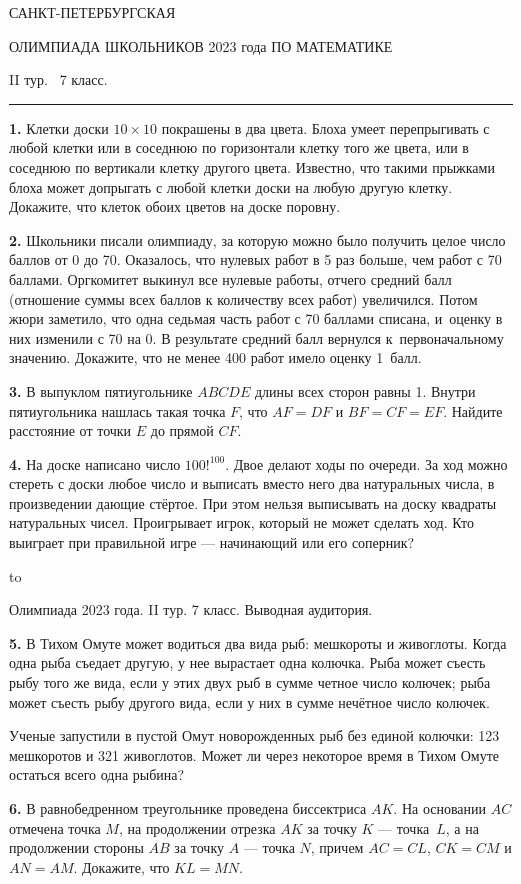 \documentclass[12pt]{article}
\def\q#1.{{\bf #1. }}
\def\dotline{\smallskip\hbox to \hsize{\dotfill}\medskip}
\begin{document}
\clearpage

\centerline{\sc САНКТ-ПЕТЕРБУРГСКАЯ}
\centerline{\sc ОЛИМПИАДА ШКОЛЬНИКОВ 2023 года ПО МАТЕМАТИКЕ}
\centerline{\sc II тур. \ 7 класс.}
\medskip
\hrule
\medskip

\q1. Клетки доски $10\times 10$ покрашены в два цвета. Блоха умеет перепрыгивать с любой клетки или в соседнюю по горизонтали клетку того же цвета, или в соседнюю по вертикали клетку другого цвета. Известно, что такими прыжками блоха может допрыгать с любой клетки доски на любую другую клетку. Докажите, что клеток обоих цветов на доске поровну.

\q2. Школьники писали олимпиаду, за которую можно было получить целое число баллов от 0 до 70. Оказалось, что нулевых работ в 5 раз больше, чем работ с 70 баллами. Оргкомитет выкинул все нулевые работы, отчего средний балл (отношение суммы всех баллов к количеству всех работ) увеличился. Потом жюри заметило, что одна седьмая часть работ с 70 баллами списана, и~оценку в них изменили с 70 на 0. В результате средний балл вернулся к~первоначальному значению. Докажите, что не менее 400 работ имело оценку 1~балл.

\q3. В выпуклом пятиугольнике $ABCDE$ длины всех сторон равны 1. Внутри пятиугольника нашлась такая точка $F$, что $AF=DF$ и $BF=CF=EF$. Найдите расстояние от точки $E$ до прямой $CF$.

\q4. На доске написано число $100!^{100}$. Двое делают ходы по очереди. За ход можно стереть с доски любое число и выписать вместо него два натуральных числа, в произведении дающие стёртое. При этом нельзя выписывать на доску квадраты натуральных чисел. Проигрывает игрок, который не может сделать ход. Кто выиграет при правильной игре --- начинающий или его соперник?

\dotline

\centerline{Олимпиада 2023 года. II тур. 7 класс. Выводная аудитория.}
\smallskip

\q5. В Тихом Омуте может водиться два вида рыб: мешкороты и
живоглоты. Когда одна рыба съедает другую, у нее вырастает
одна колючка. Рыба может съесть рыбу того же вида, если у
этих двух рыб в сумме четное число колючек; рыба может
съесть рыбу другого вида, если у них в сумме нечётное число колючек.

Ученые запустили в пустой Омут новорожденных рыб без единой колючки: 123 мешкоротов и 321 живоглотов. Может ли
через некоторое время в Тихом Омуте остаться всего одна рыбина?

\q6. В равнобедренном треугольнике проведена биссектриса $AK$. На основании $AC$ отмечена точка $M$, на продолжении отрезка $AK$ за точку $K$ --- точка~$L$, а на продолжении стороны $AB$ за точку $A$ --- точка $N$, причем $AC=CL$, $CK=CM$ и $AN=AM$. Докажите, что $KL = MN$.
\end{document}
